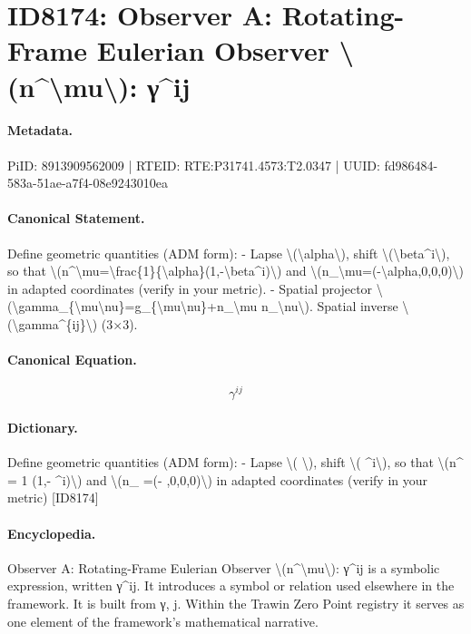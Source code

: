 \section*{ID8174: Observer A: Rotating-Frame Eulerian Observer \textbackslash{}(n\textasciicircum{}\textbackslash{}mu\textbackslash{}): γ\textasciicircum{}ij}
\paragraph{Metadata.}
PiID: 8913909562009 | RTEID: RTE:P31741.4573:T2.0347 | UUID: fd986484-583a-51ae-a7f4-08e9243010ea

\paragraph{Canonical Statement.}
Define geometric quantities (ADM form): - Lapse \textbackslash{}(\textbackslash{}alpha\textbackslash{}), shift \textbackslash{}(\textbackslash{}beta\textasciicircum{}i\textbackslash{}), so that \textbackslash{}(n\textasciicircum{}\textbackslash{}mu=\textbackslash{}frac\{1\}\{\textbackslash{}alpha\}(1,-\textbackslash{}beta\textasciicircum{}i)\textbackslash{}) and \textbackslash{}(n\_\textbackslash{}mu=(-\textbackslash{}alpha,0,0,0)\textbackslash{}) in adapted coordinates (verify in your metric). - Spatial projector \textbackslash{}(\textbackslash{}gamma\_\{\textbackslash{}mu\textbackslash{}nu\}=g\_\{\textbackslash{}mu\textbackslash{}nu\}+n\_\textbackslash{}mu n\_\textbackslash{}nu\textbackslash{}). Spatial inverse \textbackslash{}(\textbackslash{}gamma\textasciicircum{}\{ij\}\textbackslash{}) (3×3).

\paragraph{Canonical Equation.}
\[
\gamma^{ij}
\]

\paragraph{Dictionary.}
Define geometric quantities (ADM form): - Lapse \textbackslash{}( \textbackslash{}), shift \textbackslash{}( \textasciicircum{}i\textbackslash{}), so that \textbackslash{}(n\textasciicircum{} = 1 (1,- \textasciicircum{}i)\textbackslash{}) and \textbackslash{}(n\_ =(- ,0,0,0)\textbackslash{}) in adapted coordinates (verify in your metric) [ID8174]

\paragraph{Encyclopedia.}
Observer A: Rotating-Frame Eulerian Observer \textbackslash{}(n\textasciicircum{}\textbackslash{}mu\textbackslash{}): γ\textasciicircum{}ij is a symbolic expression, written γ\textasciicircum{}ij. It introduces a symbol or relation used elsewhere in the framework. It is built from γ, j. Within the Trawin Zero Point registry it serves as one element of the framework's mathematical narrative.
